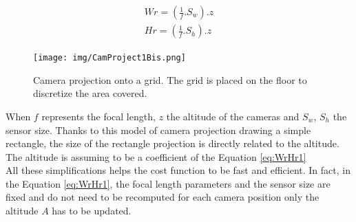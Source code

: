 	
	\begin{equation} \label{eq:WrHr1}
	\begin{split}
			Wr=(\frac{1}{f} . S_w).z\\
			Hr=(\frac{1}{f} . S_h).z
     \end{split} 
	\end{equation}
	
	\begin{figure}[t!]
		\centering
  		\texttt{[image: img/CamProject1Bis.png]}
  
 	 	\endminipage\hfill\caption{Camera projection onto a grid. The grid is placed on the floor to discretize 	the area covered.}\label{fig:cam_proj}
	\end{figure}




When $f$ represents the focal length, $z$ the altitude of the cameras and  $S_w$, $S_h$ the sensor size.
Thanks to this model of camera projection drawing a simple rectangle, the size of the rectangle projection is directly related to the altitude. The altitude is assuming to be a coefficient of the Equation \ref{eq:WrHr1}\\
All these simplifications helps the cost function to be fast and efficient.  In fact, in the Equation \ref{eq:WrHr1}, the focal length parameters and the sensor size are fixed and do not need to be recomputed for each camera position only the altitude $A$ has to be updated.\\

